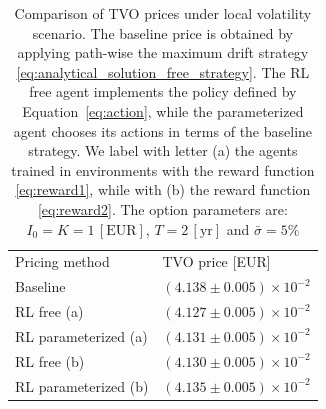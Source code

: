 \documentclass[runningheads]{m2ef}
\newcommand{\change}[1]{{\color{red} {#1}}}%
\begin{document}
\begin{table}
\begin{center}
\caption{Comparison of TVO prices under local volatility \change{scenario}. The baseline price is obtained by applying path-wise the maximum drift strategy \eqref{eq:analytical_solution_free_strategy}. The RL free agent implements the policy defined by Equation~\eqref{eq:action}, while the parameterized agent chooses its actions in terms of the baseline strategy. We label with letter (a) the agents trained in environments with the reward function \eqref{eq:reward1}, while with (b) the reward function \eqref{eq:reward2}. The option parameters are: $I_0=K=1\,[\text{EUR}]$, $T=2\,[\text{yr}]$ and $\bar{\sigma}=5\%$}
\label{tab:mc_results_lv}
\begin{tabular}{ll}
\hline\noalign{\smallskip}
Pricing method & TVO price [EUR] \\
\noalign{\smallskip}
\hline
\noalign{\smallskip}
Baseline &  $(4.138 \pm 0.005)\times 10^{-2}$\\
RL free (a) & $(4.127 \pm 0.005) \times 10^{-2}$ \\
RL parameterized (a) & $(4.131 \pm 0.005) \times 10^{-2}$ \\
RL free (b) & $(4.130 \pm 0.005) \times 10^{-2}$ \\
RL parameterized (b) & $(4.135 \pm 0.005) \times 10^{-2}$ \\
\hline
\end{tabular}
\end{center}
\end{table}
\setlength{\tabcolsep}{1.4pt}
\end{document}
